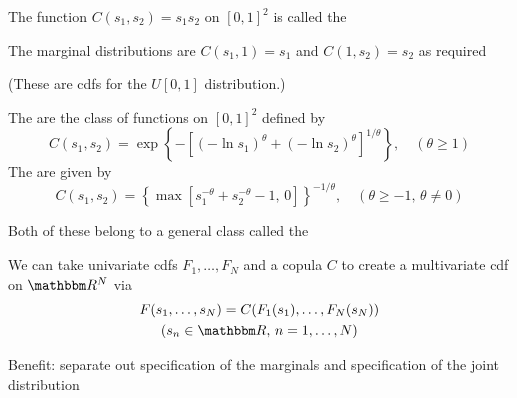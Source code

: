 \begin{frame}

    \vspace{2em}
    \Eg The function $C(s_1, s_2) = s_1 s_2$ on $[0, 1]^2$ is called the
    
    \vspace{1em}
    The marginal distributions are $C(s_1, 1) =
    s_1$ and $C(1, s_2) = s_2$ as required
    
    (These are {\sc cdf}s for the
    $U[0, 1]$ distribution.)

\end{frame}

\begin{frame}

    \vspace{2em}
    \Eg
    The  are the class of functions on $[0, 1]^2$ defined by
    \begin{equation*}
        C(s_1, s_2) = 
        \exp 
        \left\{
            - \left[ 
                (-\ln s_1)^\theta + (-\ln s_2)^\theta
            \right]^{1/\theta}
        \right\}
        , \quad (\theta \geq 1)
    \end{equation*}
    The  are given by
    \begin{equation*}
        C(s_1, s_2) = 
        \left\{
            \max \left[
                s_1^{-\theta} +  s_2^{-\theta} -1, \, 0
                \right]
        \right\}^{-1/\theta}
        ,\quad (\theta \geq -1, \, \theta \not= 0)
    \end{equation*}
   
    Both of these belong to a general class called the 

\end{frame}

\begin{frame}

    \vspace{2em}
    We can take univariate {\sc cdf}s
    $F_1, \ldots, F_N$ and a copula $C$ to create a multivariate {\sc cdf} on
    $\RR^N$ via
    \begin{multline}
        \label{eq:ffcop}
        F(s_1, \ldots, s_N) = C(F_1(s_1), \ldots, F_N(s_N))
        \\ (s_n \in \RR, \, n=1, \ldots, N)
    \end{multline}
    
    \vspace{1em}
    Benefit: separate out
    specification of the marginals and specification of the joint distribution
    
\end{frame}

